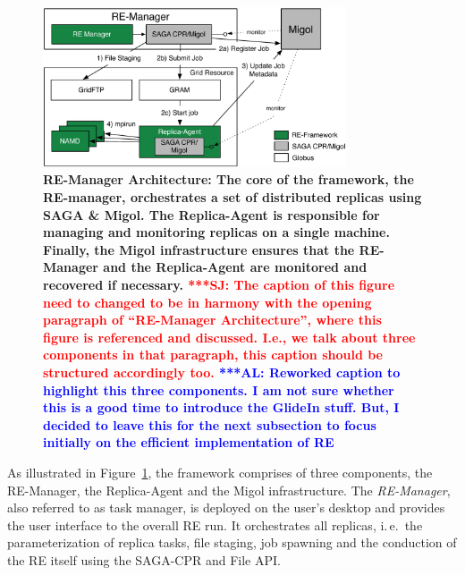 \documentclass{rspublic}
\newcommand{\alnote}[1]{ {\textcolor{blue} { ***AL: #1 }}}
\newcommand{\jhanote}[1]{ {\textcolor{red} { ***SJ: #1 }}}
\newcommand{\alnote}[1]{}
\newcommand{\jhanote}[1]{}
\begin{document}
\begin{figure}[t]
      \centering
          \includegraphics[width=0.8\textwidth]{REMDgManager-architecture.pdf}
          \caption{\footnotesize \bf RE-Manager Architecture: The
            core of the framework, the RE-manager, orchestrates 
            a set of distributed replicas using SAGA \& Migol. 
            The Replica-Agent is responsible for managing and monitoring 
            replicas on a single machine. Finally, the Migol 
            infrastructure ensures that the RE-Manager and the Replica-Agent 
            are monitored and recovered if necessary.            
            \jhanote{The caption of this
              figure need to changed to be in harmony with the opening
              paragraph of ``RE-Manager Architecture'', where this
              figure is referenced and discussed. I.e., we talk about
              three components in that paragraph, this caption should
              be structured accordingly too.}
              \alnote{Reworked caption to highlight this three components. 
              I am not sure whether this is a good time to introduce the GlideIn stuff. But, I 
              decided to leave this for the next subsection to focus initially on
              the efficient implementation of RE}
              }
      \label{fig:REMD-Manager-architecture}
\end{figure}

As illustrated in Figure~\ref{fig:REMD-Manager-architecture}, the
framework comprises of three components, the RE-Manager,
the Replica-Agent and the Migol infrastructure. 
The  \emph{RE-Manager}, also referred to as task manager,
is deployed on the user's desktop and provides the user interface 
to the overall RE run. It orchestrates all replicas, i.\,e.\ the 
parameterization of replica  tasks, file staging, job spawning 
and the conduction of the RE itself using the SAGA-CPR
and File API.                                                                
\end{document}
